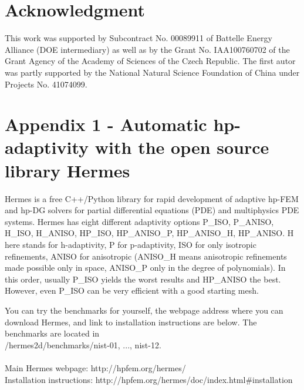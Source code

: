 \documentclass[12pt]{elsarticle}
\begin{document}
\section{Acknowledgment}

This work was supported by Subcontract No. 00089911 of Battelle
Energy Alliance (DOE intermediary) as well as by the
Grant No. IAA100760702 of the Grant Agency of the Academy
of Sciences of the Czech Republic. The first autor was partly
supported by the National Natural Science Foundation
of China under Projects No. 41074099.

\section{Appendix 1 - Automatic hp-adaptivity with the open source library Hermes}
Hermes is a free C++/Python library for rapid development of adaptive hp-FEM and hp-DG solvers for partial differential equations (PDE) and multiphysics PDE systems. Hermes has eight different adaptivity options P\_ISO, P\_ANISO, H\_ISO, H\_ANISO, HP\_ISO, HP\_ANISO\_P, HP\_ANISO\_H, HP\_ANISO. H here stands for h-adaptivity, P for p-adaptivity, ISO for only isotropic refinements, ANISO for anisotropic (ANISO\_H means anisotropic refinements made possible only in space, ANISO\_P only in the degree of polynomials). In this order, usually P\_ISO yields the worst results and HP\_ANISO the best. However, even P\_ISO can be very efficient with a good starting mesh. 

You can try the benchmarks for yourself, the webpage address where you can download Hermes, and link to installation instructions are below. The benchmarks are located in\\
/hermes2d/benchmarks/nist-01, ..., nist-12.
\\ \\
Main Hermes webpage: http://hpfem.org/hermes/\\
Installation instructions: \small{http://hpfem.org/hermes/doc/index.html\#installation}





\end{document}
